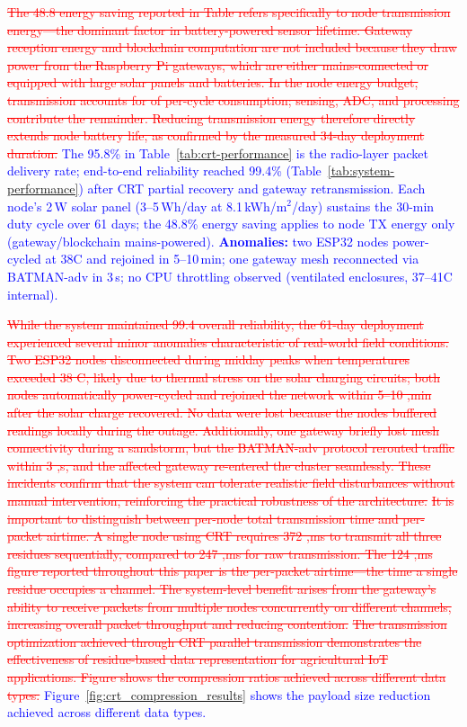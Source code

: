 \documentclass[pdflatex,sn-mathphys-num]{sn-jnl}
\theoremstyle{thmstyleone}
\theoremstyle{thmstyletwo}
\theoremstyle{thmstylethree}
\begin{document}
{\textcolor{red}{\sout{The 48.8 energy saving reported in Table refers specifically to node transmission energy---the dominant factor in battery-powered sensor lifetime. Gateway reception energy and blockchain computation are not included because they draw power from the Raspberry Pi gateways, which are either mains-connected or equipped with large solar panels and batteries. In the node energy budget, transmission accounts for of per-cycle consumption; sensing, ADC, and processing contribute the remainder. Reducing transmission energy therefore directly extends node battery life, as confirmed by the measured 34-day deployment duration.}}
\textcolor{blue}{The 95.8\% in Table~\ref{tab:crt-performance} is the radio-layer packet delivery rate; end-to-end reliability reached 99.4\% (Table~\ref{tab:system-performance}) after CRT partial recovery and gateway retransmission. Each node's 2\,W solar panel (3--5\,Wh/day at 8.1\,kWh/m$^2$/day) sustains the 30-min duty cycle over 61 days; the 48.8\% energy saving applies to node TX energy only (gateway/blockchain mains-powered). \textbf{Anomalies:} two ESP32 nodes power-cycled at 38\textdegree{}C and rejoined in 5--10\,min; one gateway mesh reconnected via BATMAN-adv in 3\,s; no CPU throttling observed (ventilated enclosures, 37--41\textdegree{}C internal).}

\textcolor{red}{\sout{While the system maintained 99.4 overall reliability, the 61-day deployment experienced several minor anomalies characteristic of real-world field conditions. Two ESP32 nodes disconnected during midday peaks when temperatures exceeded 38 C, likely due to thermal stress on the solar charging circuits; both nodes automatically power-cycled and rejoined the network within 5--10 ,min after the solar charge recovered. No data were lost because the nodes buffered readings locally during the outage. Additionally, one gateway briefly lost mesh connectivity during a sandstorm, but the BATMAN-adv protocol rerouted traffic within 3 ,s, and the affected gateway re-entered the cluster seamlessly. These incidents confirm that the system can tolerate realistic field disturbances without manual intervention, reinforcing the practical robustness of the architecture.}}
\textcolor{red}{\sout{It is important to distinguish between per-node total transmission time and per-packet airtime. A single node using CRT requires 372 ,ms to transmit all three residues sequentially, compared to 247 ,ms for raw transmission. The 124 ,ms figure reported throughout this paper is the per-packet airtime---the time a single residue occupies a channel. The system-level benefit arises from the gateway's ability to receive packets from multiple nodes concurrently on different channels, increasing overall packet throughput and reducing contention.}}
\textcolor{red}{\sout{The transmission optimization achieved through CRT parallel transmission demonstrates the effectiveness of residue-based data representation for agricultural IoT applications. Figure shows the compression ratios achieved across different data types.}}
\textcolor{blue}{Figure~\ref{fig:crt_compression_results} shows the payload size reduction achieved across different data types.}

}
\end{document}
